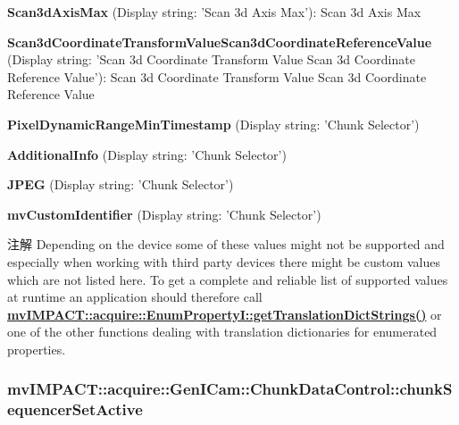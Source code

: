 \begin{DoxyItemize}
\item {\bfseries Scan3d\+Axis\+Max} (Display string\+: 'Scan 3d Axis Max')\+: Scan 3d Axis Max
\item {\bfseries Scan3d\+Coordinate\+Transform\+Value\+Scan3d\+Coordinate\+Reference\+Value} (Display string\+: 'Scan 3d Coordinate Transform Value Scan 3d Coordinate Reference Value')\+: Scan 3d Coordinate Transform Value Scan 3d Coordinate Reference Value
\item {\bfseries Pixel\+Dynamic\+Range\+Min\+Timestamp} (Display string\+: 'Chunk Selector')
\item {\bfseries Additional\+Info} (Display string\+: 'Chunk Selector')
\item {\bfseries J\+P\+E\+G} (Display string\+: 'Chunk Selector')
\item {\bfseries mv\+Custom\+Identifier} (Display string\+: 'Chunk Selector')
\end{DoxyItemize}

\begin{DoxyNote}{注解}
Depending on the device some of these values might not be supported and especially when working with third party devices there might be custom values which are not listed here. To get a complete and reliable list of supported values at runtime an application should therefore call {\bfseries \hyperlink{classmv_i_m_p_a_c_t_1_1acquire_1_1_enum_property_i_a0ba6ccbf5ee69784d5d0b537924d26b6}{mv\+I\+M\+P\+A\+C\+T\+::acquire\+::\+Enum\+Property\+I\+::get\+Translation\+Dict\+Strings()}} or one of the other functions dealing with translation dictionaries for enumerated properties. 
\end{DoxyNote}
\hypertarget{classmv_i_m_p_a_c_t_1_1acquire_1_1_gen_i_cam_1_1_chunk_data_control_a5c83ad3228ab5d5bc74603f8848961c5}{
\subsubsection[{chunk\+Sequencer\+Set\+Active}]{ mv\+I\+M\+P\+A\+C\+T\+::acquire\+::\+Gen\+I\+Cam\+::\+Chunk\+Data\+Control\+::chunk\+Sequencer\+Set\+Active}}\label{classmv_i_m_p_a_c_t_1_1acquire_1_1_gen_i_cam_1_1_chunk_data_control_a5c83ad3228ab5d5bc74603f8848961c5}


